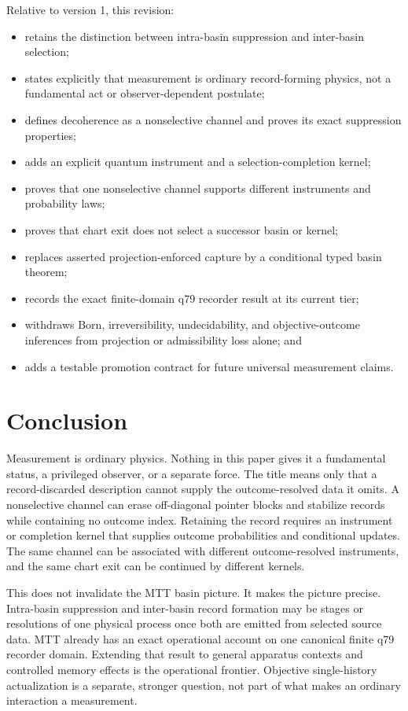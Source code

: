\documentclass[11pt]{article}
\begin{document}
Relative to version 1, this revision:
\begin{itemize}
\item retains the distinction between intra-basin suppression and inter-basin
selection;
\item states explicitly that measurement is ordinary record-forming physics,
not a fundamental act or observer-dependent postulate;
\item defines decoherence as a nonselective channel and proves its exact
suppression properties;
\item adds an explicit quantum instrument and a selection-completion kernel;
\item proves that one nonselective channel supports different instruments and
probability laws;
\item proves that chart exit does not select a successor basin or kernel;
\item replaces asserted projection-enforced capture by a conditional typed
basin theorem;
\item records the exact finite-domain q79 recorder result at its current tier;
\item withdraws Born, irreversibility, undecidability, and objective-outcome
inferences from projection or admissibility loss alone; and
\item adds a testable promotion contract for future universal measurement
claims.
\end{itemize}

\section{Conclusion}

Measurement is ordinary physics.  Nothing in this paper gives it a
fundamental status, a privileged observer, or a separate force.  The title
means only that a record-discarded description cannot supply the
outcome-resolved data it omits.  A nonselective channel can erase
off-diagonal pointer blocks and stabilize records while containing no outcome
index.  Retaining the record requires an instrument or completion kernel that
supplies outcome probabilities and conditional updates.  The same channel can
be associated with different outcome-resolved instruments, and the same chart
exit can be continued by different kernels.

This does not invalidate the MTT basin picture.  It makes the picture precise.
Intra-basin suppression and inter-basin record formation may be stages or
resolutions of one physical process once both are emitted from selected source
data.  MTT already has an exact operational account on one canonical finite
q79 recorder domain.  Extending that result to general apparatus contexts and
controlled memory effects is the operational frontier.  Objective
single-history actualization is a separate, stronger question, not part of
what makes an ordinary interaction a measurement.
\end{document}
